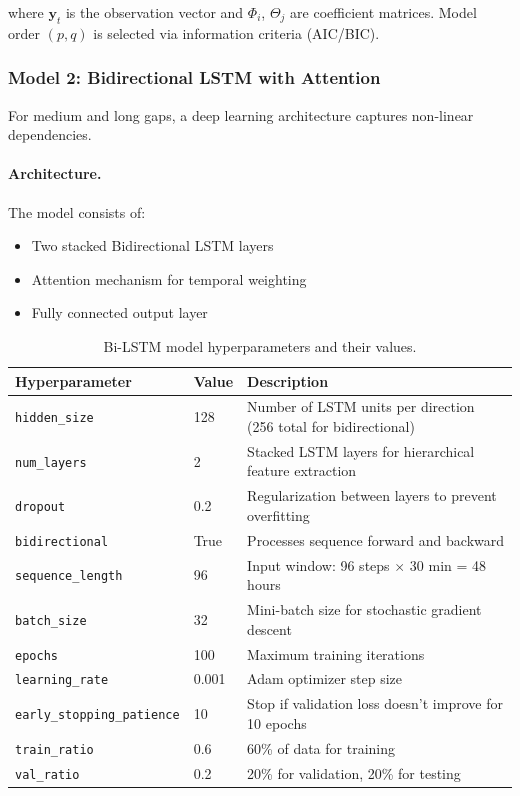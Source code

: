 \documentclass[12pt,a4paper]{article}
\begin{document}
where $\mathbf{y}_t$ is the observation vector and $\Phi_i$, $\Theta_j$ are coefficient matrices. Model order $(p,q)$ is selected via information criteria (AIC/BIC).

\subsubsection{Model 2: Bidirectional LSTM with Attention}

For medium and long gaps, a deep learning architecture \cite{hochreiter1997long, bahdanau2015neural} captures non-linear dependencies.

\paragraph{Architecture.} The model consists of:
\begin{itemize}[noitemsep]
    \item Two stacked Bidirectional LSTM layers
    \item Attention mechanism for temporal weighting
    \item Fully connected output layer
\end{itemize}

\begin{table}[H]
\centering
\caption{Bi-LSTM model hyperparameters and their values.}
\label{tab:lstm_params}
\begin{tabular}{@{}llp{7cm}@{}}
\toprule
\textbf{Hyperparameter} & \textbf{Value} & \textbf{Description} \\ \midrule
\texttt{hidden\_size} & 128 & Number of LSTM units per direction (256 total for bidirectional) \\
\texttt{num\_layers} & 2 & Stacked LSTM layers for hierarchical feature extraction \\
\texttt{dropout} & 0.2 & Regularization between layers to prevent overfitting \\
\texttt{bidirectional} & True & Processes sequence forward and backward \\
\texttt{sequence\_length} & 96 & Input window: 96 steps $\times$ 30 min = 48 hours \\
\texttt{batch\_size} & 32 & Mini-batch size for stochastic gradient descent \\
\texttt{epochs} & 100 & Maximum training iterations \\
\texttt{learning\_rate} & 0.001 & Adam optimizer step size \\
\texttt{early\_stopping\_patience} & 10 & Stop if validation loss doesn't improve for 10 epochs \\
\texttt{train\_ratio} & 0.6 & 60\% of data for training \\
\texttt{val\_ratio} & 0.2 & 20\% for validation, 20\% for testing \\
\bottomrule
\end{tabular}
\end{table}
\end{document}
